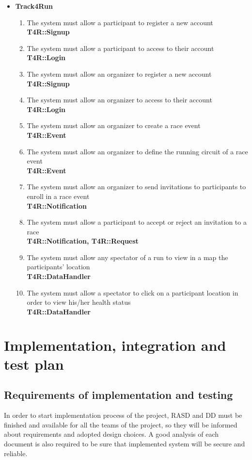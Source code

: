 \documentclass[a4paper, hidelinks, 12pt]{report}
\newcommand\requirement[1]{\item[{[R#1]}] }
\begin{document}
\begin{itemize}
	\item{\textbf{Track4Run}}
	\begin{enumerate}
		\requirement{16} The system must allow a participant to register a new account \\
		\textbf{T4R::Signup}
		\requirement{17} The system must allow a participant to access to their account \\
		\textbf{T4R::Login}
		\requirement{18} The system must allow an organizer to register a new account \\
		\textbf{T4R::Signup}
		\requirement{19} The system must allow an organizer to access to their account \\
		\textbf{T4R::Login}
		\requirement{20} The system must allow an organizer to create a race event \\ 
		\textbf{T4R::Event}
		\requirement{21} The system must allow an organizer to define the running circuit of a race event \\
		\textbf{T4R::Event}
		\requirement{22} The system must allow an organizer to send invitations to participants to enroll in a race event \\
		\textbf{T4R::Notification}
		\requirement{23} The system must allow a participant to accept or reject an invitation to a race \\
		\textbf{T4R::Notification, T4R::Request}
		\requirement{24} The system must allow any spectator of a run to view in a map the participants' location \\ 
		\textbf{T4R::DataHandler}
		\requirement{25} The system must allow a spectator to click on a participant location in order to view his/her health status \\
		\textbf{T4R::DataHandler}
	\end{enumerate}
\end{itemize}

	\chapter{Implementation, integration and test plan}
	\section{Requirements of implementation and testing}
In order to start implementation process of the project, RASD and DD must be finished and available for all the teams of the project, so they will be informed about requirements and adopted design choices. A good analysis of each document is also required to be sure that implemented system will be secure and reliable.\\
\end{document}
